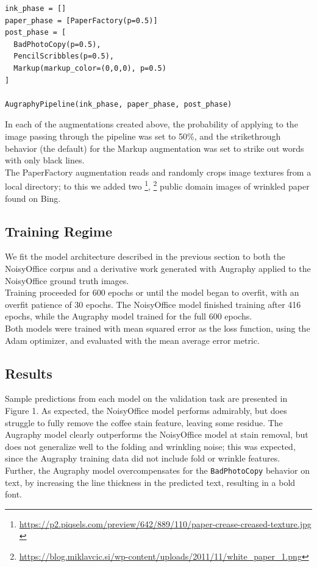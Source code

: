 \documentclass[runningheads]{llncs}
\begin{document}
\begin{lstlisting}
ink_phase = []
paper_phase = [PaperFactory(p=0.5)]
post_phase = [
  BadPhotoCopy(p=0.5),
  PencilScribbles(p=0.5),
  Markup(markup_color=(0,0,0), p=0.5)
]

AugraphyPipeline(ink_phase, paper_phase, post_phase)
\end{lstlisting}

In each of the augmentations created above, the probability of applying to the image passing through the pipeline was set to 50\%, and the strikethrough behavior (the default) for the Markup augmentation was set to strike out words with only black lines.\\

The PaperFactory augmentation reads and randomly crops image textures from a local directory; to this we added two \footnote{\url{https://p2.piqsels.com/preview/642/889/110/paper-crease-creased-texture.jpg
}}, \footnote{\url{https://blog.miklavcic.si/wp-content/uploads/2011/11/white_paper_1.png}} public domain images of wrinkled paper found on Bing.

\subsection{Training Regime}
We fit the model architecture described in the previous section to both the NoisyOffice corpus and a derivative work generated with Augraphy applied to the NoisyOffice ground truth images.\\

Training proceeded for 600 epochs or until the model began to overfit, with an overfit patience of 30 epochs. The NoisyOffice model finished training after 416 epochs, while the Augraphy model trained for the full 600 epochs.\\

Both models were trained with mean squared error as the loss function, using the Adam optimizer, and evaluated with the mean average error metric.

\subsection{Results}
Sample predictions from each model on the validation task are presented in Figure 1. As expected, the NoisyOffice model performs admirably, but does struggle to fully remove the coffee stain feature, leaving some residue. The Augraphy model clearly outperforms the NoisyOffice model at stain removal, but does not generalize well to the folding and wrinkling noise; this was expected, since the Augraphy training data did not include fold or wrinkle features. Further, the Augraphy model overcompensates for the \texttt{BadPhotoCopy} behavior on text, by increasing the line thickness in the predicted text, resulting in a bold font.\\
\end{document}

